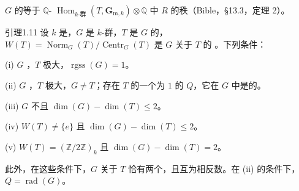  $G$ 的等于 $\mathbb Q$- $\operatorname{Hom}_{k\text{-群}}(T,\mathbf G_{\mathrm m,k})\otimes\mathbb Q$ 中 $R$ 的秩（Bible，\S 13.3，定理 2）。
\begin{SGAresult}{引理}{1.11}
设 $k$ 是，$G$ 是 $k$-群，$T$ 是 $G$ 的，$W(T)=\operatorname{Norm}_G(T)/\operatorname{Centr}_G(T)$ 是 $G$ 关于 $T$ 的 。下列条件：

(i) $G$ ，$T$ 极大，$\operatorname{rgss}(G)=1$。

(ii) $G$ ，$T$ 极大，$G\ne T$；存在 $T$ 的一个为 $1$ 的 $Q$，它在 $G$ 中是的。

(iii) $G$ 不且 $\dim(G)-\dim(T)\le2$。

(iv) $W(T)\ne\{e\}$ 且 $\dim(G)-\dim(T)\le2$。

(v) $W(T)=(\mathbb Z/2\mathbb Z)_k$ 且 $\dim(G)-\dim(T)=2$。

此外，在这些条件下，$G$ 关于 $T$ 恰有两个，且互为相反数。在 (ii) 的条件下，$Q=\operatorname{rad}(G)$。
\end{SGAresult}
